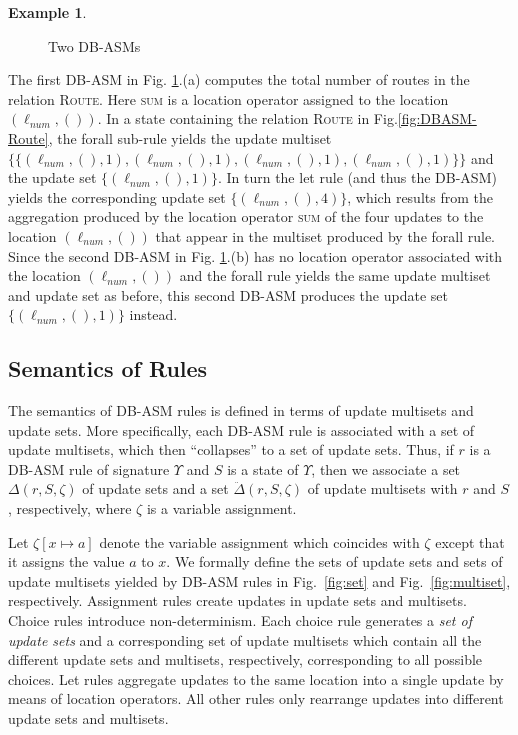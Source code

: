 \documentclass[preprint,11pt]{elsarticle}
\theoremstyle{definition}
\newtheorem{example}{Example}[section]
\theoremstyle{remark}
\begin{document}
\begin{example}
\begin{figure}[!htbp]
\caption{Two DB-ASMs}
\label{fig:tworules}
\end{figure}

The first DB-ASM in Fig. \ref{fig:tworules}.(a) computes the total number of
routes in the relation \textsc{Route}. Here \textsc{sum} is a
location operator assigned to the location $(\ell_{num},())$. In a state containing the
relation \textsc{Route} in Fig.\ref{fig:DBASM-Route}, 
the forall sub-rule yields the update multiset $\{\!\!\{(\ell_{num},(),1), (\ell_{num},(),1),
(\ell_{num},(),1),(\ell_{num},(),1)\}\!\!\}$ and the update set $\{(\ell_{num},(),1)\}$. In turn the let rule (and thus the DB-ASM) yields the corresponding update set $\{(\ell_{num},(),4)\}$, which results from the aggregation produced by the location operator \textsc{sum} of the four updates to the location $(\ell_{num},())$ that appear in the multiset produced by the forall rule. Since the second DB-ASM in Fig. \ref{fig:tworules}.(b) has no location operator associated with the location $(\ell_{num}, ())$ and  the forall rule yields the same update multiset and update set as before, this second DB-ASM produces the update set $\{(\ell_{num},(),1)\}$ instead.
\end{example}


\subsection{Semantics of Rules}
The semantics of DB-ASM rules is defined in terms of update
multisets and update sets. More specifically, each DB-ASM rule is
associated with a set of update multisets, which then ``collapses'' to a set of
update sets. Thus, if $r$ is a DB-ASM rule of
signature $\Upsilon$ and $S$ is a state of $\Upsilon$, then we
associate a set $\Delta(r,S,\zeta)$ of update sets and a set
$\ddot{\Delta}(r,S,\zeta)$ of update multisets with $r$ and $S$,
respectively, where $\zeta$ is a variable assignment.

Let $\zeta[x \mapsto a]$ denote the variable assignment which coincides with $\zeta$ except that it assigns the value $a$ to $x$.
We formally define the sets of update sets and sets of update
multisets yielded by DB-ASM rules in Fig.~\ref{fig:set} and Fig.~\ref{fig:multiset}, respectively. Assignment rules create
updates in update sets and multisets.  Choice rules introduce
non-determinism. Each choice rule generates a \emph{set of update sets} and a corresponding set of update multisets which contain all the different update sets and multisets, respectively, corresponding to all possible choices. Let rules aggregate updates to the same location
into a single update by means of location operators. All other rules
only rearrange updates into different update sets and multisets.
\end{document}
